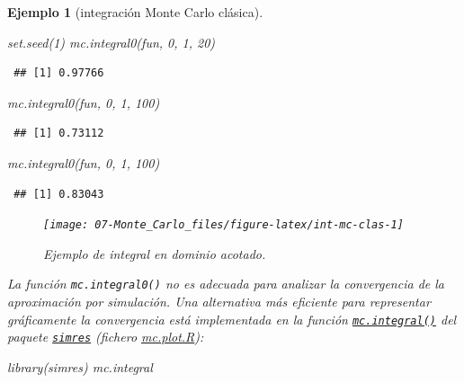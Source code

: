 \documentclass[
  10pt,
]{book}
\newenvironment{Shaded}{\begin{snugshade}}{\end{snugshade}}
\newcommand{\DecValTok}[1]{\textcolor[rgb]{0.00,0.00,0.81}{#1}}
\newcommand{\FunctionTok}[1]{\textcolor[rgb]{0.00,0.00,0.00}{#1}}
\newcommand{\NormalTok}[1]{#1}
\theoremstyle{break}
\newtheorem{example}{Ejemplo}[chapter]
\theoremstyle{nonumberplain}
\begin{document}
\begin{example}[integración Monte Carlo clásica]
\begin{Shaded}
\begin{Highlighting}[]
\FunctionTok{set.seed}\NormalTok{(}\DecValTok{1}\NormalTok{)}
\FunctionTok{mc.integral0}\NormalTok{(fun, }\DecValTok{0}\NormalTok{, }\DecValTok{1}\NormalTok{, }\DecValTok{20}\NormalTok{)}
\end{Highlighting}
\end{Shaded}

\begin{verbatim}
 ## [1] 0.97766
\end{verbatim}

\begin{Shaded}
\begin{Highlighting}[]
\FunctionTok{mc.integral0}\NormalTok{(fun, }\DecValTok{0}\NormalTok{, }\DecValTok{1}\NormalTok{, }\DecValTok{100}\NormalTok{)}
\end{Highlighting}
\end{Shaded}

\begin{verbatim}
 ## [1] 0.73112
\end{verbatim}

\begin{Shaded}
\begin{Highlighting}[]
\FunctionTok{mc.integral0}\NormalTok{(fun, }\DecValTok{0}\NormalTok{, }\DecValTok{1}\NormalTok{, }\DecValTok{100}\NormalTok{)}
\end{Highlighting}
\end{Shaded}

\begin{verbatim}
 ## [1] 0.83043
\end{verbatim}

\begin{figure}[!htbp]

{\centering \texttt{[image: 07-Monte\_Carlo\_files/figure-latex/int-mc-clas-1]} 

}

\caption{Ejemplo de integral en dominio acotado.}\label{fig:int-mc-clas}
\end{figure}

La función \texttt{mc.integral0()} no es adecuada para analizar la convergencia de la aproximación por simulación.
Una alternativa más eficiente para representar gráficamente la convergencia está implementada en la función \href{https://rubenfcasal.github.io/simres/reference/mc.integral.html}{\texttt{mc.integral()}} del paquete \href{https://rubenfcasal.github.io/simres}{\texttt{simres}} (fichero \href{R/mc.plot.R}{\emph{mc.plot.R}}):

\begin{Shaded}
\begin{Highlighting}[]
\FunctionTok{library}\NormalTok{(simres)}
\NormalTok{mc.integral}
\end{Highlighting}
\end{Shaded}


\end{example}
\end{document}
